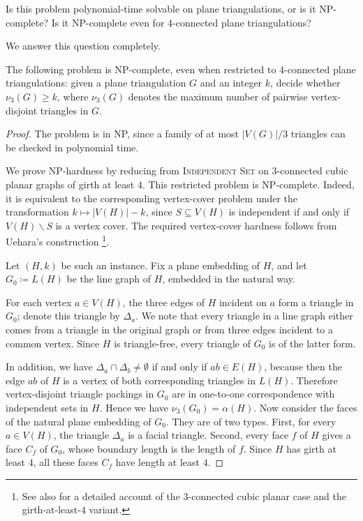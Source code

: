 \documentclass{patmorin}
\newcommand{\sm}{\smallsetminus}
\begin{document}
Is this problem polynomial-time solvable on plane triangulations, or is it
NP-complete? Is it NP-complete even for $4$-connected plane triangulations?

We answer this question completely.


\begin{thm}
The following problem is NP-complete, even when restricted to
$4$-connected plane triangulations:
given a plane triangulation $G$ and an integer $k$, decide whether $\nu_3(G) \ge k$, where $\nu_3(G)$ denotes the maximum number of pairwise vertex-disjoint triangles in $G$.
\end{thm}

\begin{proof}
The problem is in NP, since a family of at most $|V(G)|/3$ triangles can be checked in polynomial time.

We prove NP-hardness by reducing from \textsc{Independent Set} on $3$-connected cubic planar graphs of girth at least $4$.  
This restricted problem is NP-complete.  Indeed, it is equivalent to the corresponding vertex-cover problem under the transformation $k \mapsto |V(H)|-k$, since $S \subseteq V(H)$ is independent if and only if $V(H)\sm  S$ is a vertex cover.  
The required vertex-cover hardness follows from Uehara's construction \cite{Uehara1996}\footnote{See also \cite[Lemma~3.1 and Remark~3.8]{seo2026complexity} for a detailed account of the $3$-connected cubic planar case and the girth-at-least-$4$ variant.}.

Let $(H,k)$ be such an instance.  
Fix a plane embedding of $H$, and let $G_0 \coloneqq L(H)$ be the line graph of $H$, embedded in the natural way.

For each vertex $a \in V(H)$, the three edges of $H$ incident on $a$ form a triangle in $G_0$; denote this triangle by $\Delta_a$.
We note that every triangle in a line graph either comes from a triangle in the original graph or from three edges incident to a common vertex.
Since $H$ is triangle-free, every triangle of $G_0$ is of the latter form.

In addition, we have $\Delta_a \cap \Delta_b \neq \emptyset$ if and only if $ab \in E(H)$, because then the edge $ab$ of $H$ is a vertex of both corresponding triangles in $L(H)$.  
Therefore vertex-disjoint triangle packings in $G_0$ are in one-to-one correspondence with independent sets in $H$.
Hence we have $\nu_3(G_0) = \alpha(H)$.
Now consider the faces of the natural plane embedding of $G_0$.  They
are of two types.  
First, for every $a \in V(H)$, the triangle $\Delta_a$ is a facial triangle.  
Second, every face $f$ of $H$ gives a face $C_f$ of $G_0$, whose boundary length is the length of $f$.
Since $H$ has girth at least $4$, all these faces $C_f$ have length at least $4$.


\end{proof}
\end{document}
